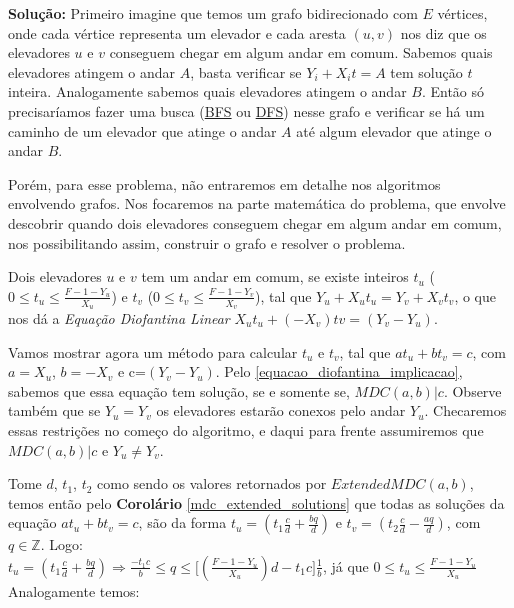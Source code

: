 \textbf{Solução:} 
Primeiro imagine que temos um grafo bidirecionado com $E$ vértices, onde cada vértice representa um elevador e cada aresta $(u,v)$ nos diz que os elevadores $u$ e $v$ 
conseguem chegar em algum andar em comum.
Sabemos quais elevadores atingem o andar $A$, basta verificar se $Y_i+X_it=A$ tem solução $t$ inteira. Analogamente sabemos quais elevadores atingem o andar
$B$. Então só precisaríamos fazer uma busca (\href{https://en.wikipedia.org/wiki/Breadth-first_search}{BFS} ou \href{https://en.wikipedia.org/wiki/Depth-first_search}{DFS})
nesse grafo e verificar se há um caminho de um elevador que atinge o andar $A$ até algum elevador que atinge o andar $B$.

Porém, para esse problema, não entraremos em detalhe nos algoritmos envolvendo grafos. Nos focaremos na parte matemática do problema, que envolve descobrir quando dois elevadores conseguem chegar em algum andar em comum, nos possibilitando assim, construir o grafo e resolver o problema.

Dois elevadores $u$ e $v$ tem um andar em comum, se existe inteiros $t_u$ ($0\leq t_u\leq \frac{F-1-Y_u}{X_u}$) e $t_v$ ($0\leq t_v\leq \frac{F-1-Y_v}{X_v}$), tal que
$Y_u+X_ut_u = Y_v+X_vt_v$, o que nos dá a \textit{Equação Diofantina Linear} $X_ut_u + (-X_v)tv = (Y_v-Y_u)$.

Vamos mostrar agora um método para calcular $t_u$ e $t_v$, tal que $at_u + bt_v = c$, com $a=X_u$, $b=-X_v$ e c=$(Y_v-Y_u)$.
Pelo \autoref{equacao_diofantina_implicacao}, sabemos que essa equação tem solução, se e somente se, $MDC(a,b)|c$. Observe também que se $Y_u=Y_v$ os elevadores estarão
conexos pelo andar $Y_u$. Checaremos essas restrições no começo do algoritmo, e daqui para frente assumiremos que $MDC(a,b)|c$ e $Y_u\neq Y_v$.

Tome $d$, $t_1$, $t_2$ como sendo os valores retornados por $ExtendedMDC(a,b)$, temos então pelo \textbf{Corolário} \autoref{mdc_extended_solutions} que todas as soluções da
equação $at_u + bt_v = c$, são da forma $t_u = (t_1\frac{c}{d} + \frac{bq}{d})$ e $t_v = (t_2\frac{c}{d} - \frac{aq}{d})$, com $q \in\mathbb{Z}$. Logo:
\\

$t_u = (t_1\frac{c}{d} + \frac{bq}{d}) \Rightarrow \frac{-t_1c}{b} \leq q \leq \big[(\frac{F-1-Y_u}{X_u})d - t_1c\big]\frac{1}{b}$, já que $0\leq t_u\leq \frac{F-1-Y_u}{X_u}$
\\

Analogamente temos:
\\

